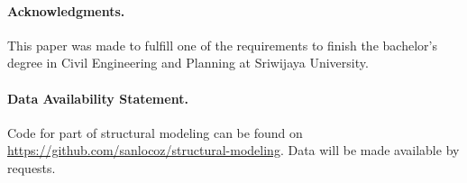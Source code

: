 \documentclass{cup-pan}
\begin{document}
%


\bigskip

\paragraph*{Acknowledgments.} This paper was made to fulfill one of the requirements to finish the bachelor's degree in Civil Engineering and Planning at Sriwijaya University.

\paragraph*{Data Availability Statement.} Code for part of structural modeling can be found on \url{https://github.com/sanlocoz/structural-modeling}. Data will be made available by requests.

\nocite{*}
\printbibliography
\end{document}
